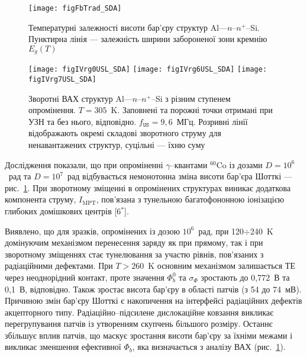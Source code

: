 \begin{figure}
\center
\texttt{[image: figFbTrad\_SDA]}
\caption{\label{figFbTrad_SDA}
Температурні залежності висоти бар'єру структур Al---$n$--$n^+$--Si.
Пунктирна лінія --- залежність ширини забороненої зони кремнію $E_g(T)$
}%
\end{figure}



\begin{figure}[b]
\center
\texttt{[image: figIVrg0USL\_SDA]}\hfill
\texttt{[image: figIVrg6USL\_SDA]}\hfill
\texttt{[image: figIVrg7USL\_SDA]}
\caption{\label{figIVrg0USL_SDA}
Зворотні  ВАХ  структур Al---$n$--$n^+$--Si з різним ступенем опромінення.
$T=305$~K.
Заповнені та порожні точки отримані при УЗН та без нього, відповідно.
$f_\mathtt{US}=9,6$~МГц.
Розривні лінії відображають окремі складові зворотного струму для ненавантажених структур,
суцільні --- їхню суму
}%
\end{figure}

Дослідження показали, що при
опроміненні $\gamma$--квантами $^{60}$Co із дозами $D\!=\!10^6$~рад та $D\!=\!10^7$~рад відбувається
немонотонна зміна висоти бар'єра Шотткі --- рис.~\ref{figFbTrad_SDA}.
При зворотному зміщенні в опромінених структурах виникає додаткова компонента струму, $I_\mathrm{MPT}$,
пов'язана з тунельною багатофононною іонізацією глибоких домішкових центрів
[6$^*$].

Виявлено, що для зразків, опромінених із дозою  $10^6$~рад, при 120$\div$240~K домінуючим механізмом перенесення заряду як при прямому, так і при зворотному зміщеннях стає тунелювання за участю рівнів, пов'язаних з радіаційними дефектами.
При $T>260$~K основним механізмом залишається ТЕ через неоднорідний контакт, проте значення $\Phi_b^0$ та $\sigma_{\Phi}$
зростають до 0,772~В та 0,1~В, відповідно.
Також зростає висота бар'єру в області патчів (з 54 до 74~мВ).
Причиною змін бар'єру Шотткі є накопичення на інтерфейсі радіаційних дефектів акцепторного типу.
Радіаційно--підсилене дислокаційне ковзання викликає  перегрупування патчів із утворенням скупчень більшого розміру.
Останнє збільшує вплив патчів, що  маскує зростання висоти бар'єру за їхніми межами і викликає зменшення ефективної $\Phi_b$, яка визначається з аналізу ВАХ (рис.~\ref{figFbTrad_SDA}).

